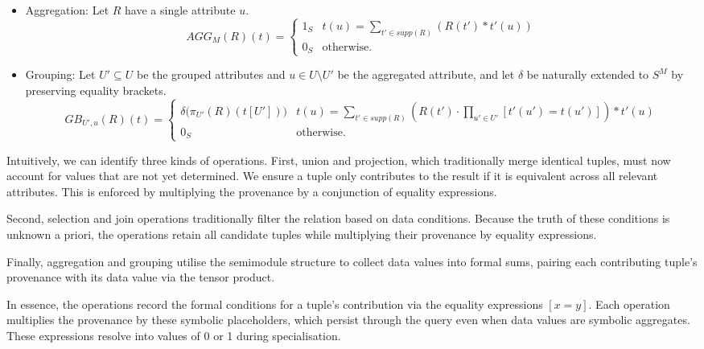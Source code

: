 \documentclass[oneside, 11pt]{amsbook}
\theoremstyle{plain}
\theoremstyle{definition}
\theoremstyle{remark}
\begin{document}
\begin{defn}
\begin{itemize}
\[              \]
        \item Aggregation: Let $R$ have a single attribute $u$.
              \[
                  AGG_M(R)(t) =
                  \begin{cases}
                      1_S & t(u) = \sum\limits_{t' \in supp(R)} \left( R(t') \ast t'(u) \right) \\
                      0_S & \text{otherwise.}
                  \end{cases}
              \]
        \item Grouping: Let $U' \subseteq U$ be the grouped attributes and $u \in U \setminus U'$ be the aggregated attribute, and let $\delta$ be naturally extended to $S^M$ by preserving equality brackets.
              \[
                  GB_{U', u}(R)(t) =
                  \begin{cases}
                      \delta \big( \pi_{U'} (R)(t[U']) \big) & t(u) = \sum\limits_{t' \in supp(R)} \left( R(t') \cdot \prod\limits_{u' \in U'} [t'(u') = t(u')] \right) \ast t'(u) \\
                      0_S                                    & \text{otherwise.}
                  \end{cases}
              \]
    \end{itemize}
\end{defn}

Intuitively, we can identify three kinds of operations. First, union and projection, which traditionally merge identical tuples, must now account for values that are not yet determined. We ensure a tuple only contributes to the result if it is equivalent across all relevant attributes. This is enforced by multiplying the provenance by a conjunction of equality expressions.

Second, selection and join operations traditionally filter the relation based on data conditions. Because the truth of these conditions is unknown a priori, the operations retain all candidate tuples while multiplying their provenance by equality expressions.

Finally, aggregation and grouping utilise the semimodule structure to collect data values into formal sums, pairing each contributing tuple's provenance with its data value via the tensor product.

In essence, the operations record the formal conditions for a tuple's contribution via the equality expressions $[x=y]$. Each operation multiplies the provenance by these symbolic placeholders, which persist through the query even when data values are symbolic aggregates. These expressions resolve into values of 0 or 1 during specialisation.
\end{document}
